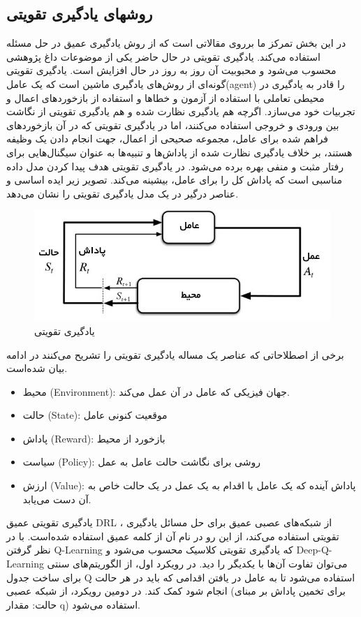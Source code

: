 \subsection{روشهای یادگیری تقویتی}
در این بخش تمرکز ما بر‌روی مقالاتی است که از روش یادگیری عمیق در حل مسئله استفاده می‌کند. 
یادگیری تقویتی
 در حال حاضر یکی از موضوعات داغ پژوهشی محسوب می‌شود و محبوبیت آن روز به روز در حال افزایش است.
یادگیری تقویتی گونه‌ای از روش‌های یادگیری ماشین است که یک عامل(agent) را قادر به یادگیری در محیطی تعاملی با استفاده از آزمون و خطاها و استفاده از بازخوردهای اعمال و تجربیات خود می‌سازد. اگرچه هم یادگیری نظارت شده و هم یادگیری تقویتی از نگاشت بین ورودی و خروجی استفاده می‌کنند، اما در یادگیری تقویتی که در آن بازخوردهای فراهم شده برای عامل، مجموعه صحیحی از اعمال، جهت انجام دادن یک وظیفه هستند، بر خلاف یادگیری نظارت شده از پاداش‌ها و تنبیه‌ها به عنوان سیگنال‌هایی برای رفتار مثبت و منفی بهره برده می‌شود. 
  در یادگیری تقویتی هدف پیدا کردن مدل داده مناسبی است که پاداش کل را برای عامل، بیشینه می‌کند. تصویر زیر ایده اساسی و عناصر درگیر در یک مدل یادگیری تقویتی را نشان می‌دهد.
\begin{figure}
  \centering
    \includegraphics[scale=0.7]{./fig/rl}
  \caption{یادگیری تقویتی}
  \label{fig:rl}
\end{figure}
برخی از اصطلاحاتی که عناصر یک مساله یادگیری تقویتی را تشریح می‌کنند در ادامه بیان شده‌است.
\begin{itemize}
\item محیط (Environment):
 جهان فیزیکی که عامل در آن عمل می‌کند.
\item حالت (State):
 موقعیت کنونی عامل
\item پاداش (Reward):
 بازخورد از محیط
\item  سیاست (Policy):
 روشی برای نگاشت حالت عامل به عمل
\item  ارزش (Value):
 پاداش آینده که یک عامل با اقدام به یک عمل در یک حالت خاص به آن دست می‌یابد.
\end{itemize}
یادگیری تقویتی عمیق
DRL ،
 از شبکه‌های عصبی عمیق برای حل مسائل یادگیری تقویتی استفاده می‌کند، از این رو در نام آن از کلمه عمیق استفاده شده‌است. با در نظر گرفتن Q-Learning که یادگیری تقویتی کلاسیک محسوب می‌شود و Deep-Q-Learning می‌توان تفاوت آن‌ها با یکدیگر را دید. در رویکرد اول، از الگوریتم‌های سنتی برای ساخت جدول Q استفاده می‌شود تا به عامل در یافتن اقدامی که باید در هر حالت انجام شود کمک کند. در دومین رویکرد، از شبکه عصبی (برای تخمین پاداش بر مبنای حالت: مقدار q) استفاده می‌شود.

